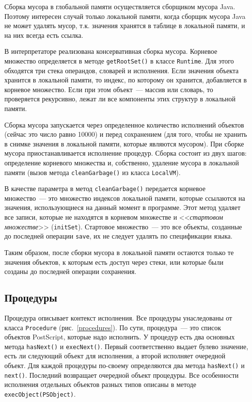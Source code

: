 \documentclass[14pt]{extarticle}
\begin{document}
Сборка мусора в глобальной памяти осуществляется сборщиком мусора Java. Поэтому интересен случай только локальной памяти, когда сборщик мусора Java не может удалять мусор, т.к. значения хранятся в таблице в локальной памяти, и на них всегда есть ссылка.

В интерпретаторе реализована консервативная сборка мусора. Корневое множество определяется в методе \texttt{getRootSet()} в классе \texttt{Runtime}. Для этого обходятся три стека операндов, словарей и исполнения. Если значения объекта хранится в локальной памяти, то индекс, по которому он хранится, добавляется в корневое множество. Если при этом объект~--- массив или словарь, то проверяется рекурсивно, лежат ли все компоненты этих структур в локальной памяти.

Сборка мусора запускается через определенное количество исполнений объектов (сейчас это число равно 10000) и  перед сохранением (для того, чтобы не хранить в снимке значения в локальной памяти, которые являются мусором).  При сборке мусора приостанавливается исполнение процедур. Сборка состоит из двух шагов: определение корневого множества и, собственно, удаление мусора в локальной памяти (вызов метода \texttt{cleanGarbage()} из класса \texttt{LocalVM}).

В качестве параметра в метод \texttt{cleanGarbage()} передается корневое множество~--- это множество индексов локальной памяти, которые ссылаются на значения, использующиеся на данный момент в программе. Этот метод удаляет все записи, которые не находятся в корневом множестве и <<\textit{стартовом множестве}>> (\texttt{initSet}). Стартовое множество~--- это все объекты, созданные до последней операции \texttt{save}, их не следует удалять по спецификации языка. 

Таким образом, после сборки мусора в локальной памяти остаются только те значения объектов, к которым есть доступ через стеки, или которые были созданы до последней операции сохранения.

\subsection{Процедуры}
Процедура  описывает контекст исполнения. Все процедуры унаследованы  от  класса \texttt{Procedure} (рис.~\ref{procedures}). По сути, процедура~--- это список объектов PostScript, которые надо исполнить. У процедур есть два основных метода \texttt{hasNext()} и \texttt{execNext()}. Первый соответственно выдает булево значение, есть ли следующий объект для исполнения, а второй исполняет очередной объект. Для каждой процедуры по-своему определяются два метода \texttt{hasNext()} и \texttt{next()}. Последний возвращает очередной объект процедуры. Все особенности исполнения отдельных объектов разных типов описаны в методе \texttt{execObject(PSObject)}.
\end{document}
